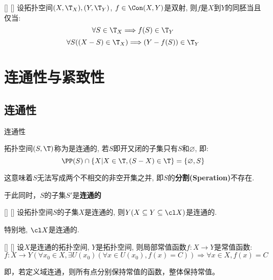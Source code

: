 \documentclass[UTF8]{ctexart}
\begin{document}
            \begin{thm}
                []
                {}
                []
                []
                设拓扑空间$(X,\T_X),(Y,\T_Y)$, $f\in\Con(X,Y)$是双射, 则$f$是$X$到$Y$的同胚当且仅当: 
                \[\forall S\in\T_X\Longrightarrow f(S)\in\T_Y\]
                \[\forall S((X-S)\in\T_X)\Longrightarrow(Y-f(S))\in\T_Y\]
            \end{thm}

    \section{连通性与紧致性}

        \subsection{连通性}
            
            \begin{dfn}
                {连通性}

                拓扑空间$(S,\T)$称为是连通的, 若$S$即开又闭的子集只有$S$和$\varnothing$, 即: 
                \[\PP(S)\cap\{X|X\in\T,(S-X)\in\T\}=\{\varnothing,S\}\]

                这意味着$S$无法写成两个不相交的非空开集之并, 即$S$的\textbf{分割(Speration)}不存在. 

                于此同时，$S$的子集$S'$是\textbf{连通的}
            \end{dfn}
            
            \begin{ppt}
                []
                {}
                []
                []
                设拓扑空间$S$的子集$X$是连通的, 则$Y(X\subseteq Y\subseteq\cl X)$是连通的. 
                
                特别地, $\cl X$是连通的. 
            \end{ppt}
            
            \begin{ppt}
                []
                {}
                []
                []
                设$X$是连通的拓扑空间, $Y$是拓扑空间, 则局部常值函数$f:X\to Y$是常值函数: 
                \[f:X\to Y(\forall x_0\in X, \exists U(x_0)(\forall x\in U(x_0), f(x)=C))\Longrightarrow\forall x\in X, f(x)=C\]
                
                即，若定义域连通，则所有点分别保持常值的函数，整体保持常值。
            \end{ppt}
\end{document}
